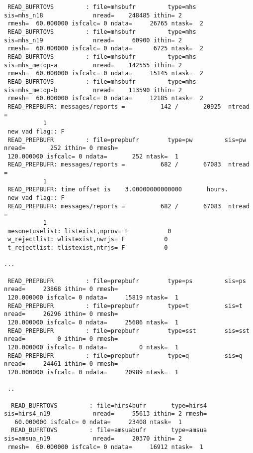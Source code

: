 \begin{tiny}
\begin{verbatim}
 READ_BUFRTOVS         : file=mhsbufr         type=mhs        sis=mhs_n18              nread=    248485 ithin= 2 
 rmesh=  60.000000 isfcalc= 0 ndata=     26765 ntask=  2
 READ_BUFRTOVS         : file=mhsbufr         type=mhs        sis=mhs_n19              nread=     60900 ithin= 2 
 rmesh=  60.000000 isfcalc= 0 ndata=      6725 ntask=  2
 READ_BUFRTOVS         : file=mhsbufr         type=mhs        sis=mhs_metop-a          nread=    142555 ithin= 2 
 rmesh=  60.000000 isfcalc= 0 ndata=     15145 ntask=  2
 READ_BUFRTOVS         : file=mhsbufr         type=mhs        sis=mhs_metop-b          nread=    113590 ithin= 2 
 rmesh=  60.000000 isfcalc= 0 ndata=     12185 ntask=  2
 READ_PREPBUFR: messages/reports =          142 /       20925  ntread =
           1
 new vad flag:: F
 READ_PREPBUFR         : file=prepbufr        type=pw         sis=pw                   nread=       252 ithin= 0 rmesh= 
 120.000000 isfcalc= 0 ndata=       252 ntask=  1
 READ_PREPBUFR: messages/reports =          682 /       67083  ntread =
           1
 READ_PREPBUFR: time offset is    3.00000000000000       hours.
 new vad flag:: F
 READ_PREPBUFR: messages/reports =          682 /       67083  ntread =
           1
 mesonetuselist: listexist,nprov= F           0
 w_rejectlist: wlistexist,nwrjs= F           0
 t_rejectlist: tlistexist,ntrjs= F           0

...

 READ_PREPBUFR         : file=prepbufr        type=ps         sis=ps                   nread=     23868 ithin= 0 rmesh= 
 120.000000 isfcalc= 0 ndata=     15819 ntask=  1
 READ_PREPBUFR         : file=prepbufr        type=t          sis=t                    nread=     26296 ithin= 0 rmesh= 
 120.000000 isfcalc= 0 ndata=     25686 ntask=  1
 READ_PREPBUFR         : file=prepbufr        type=sst        sis=sst                  nread=         0 ithin= 0 rmesh= 
 120.000000 isfcalc= 0 ndata=         0 ntask=  1
 READ_PREPBUFR         : file=prepbufr        type=q          sis=q                    nread=     24461 ithin= 0 rmesh= 
 120.000000 isfcalc= 0 ndata=     20989 ntask=  1
 
 ..
 
  READ_BUFRTOVS         : file=hirs4bufr       type=hirs4      sis=hirs4_n19            nread=     55613 ithin= 2 rmesh= 
   60.000000 isfcalc= 0 ndata=     23408 ntask=  1
  READ_BUFRTOVS         : file=amsuabufr       type=amsua      sis=amsua_n19            nread=     20370 ithin= 2 
 rmesh=  60.000000 isfcalc= 0 ndata=     16912 ntask=  1
\end{verbatim}
\end{tiny}
 

